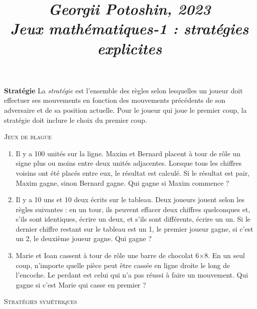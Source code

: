 \documentclass{article}
\title{
\textit{\small{Georgii Potoshin, 2023}}\\
\vspace{0.3ex}
\textit{\huge{Jeux mathématiques-1 : stratégies explicites}}\vspace{1ex}
}
\date{\vspace{-8ex}}
\begin{document}
\maketitle

\textbf{Stratégie} La \emph{stratégie} est l'ensemble des règles selon lesquelles un joueur doit effectuer ses mouvements en fonction des mouvements précédents de son adversaire et de sa position actuelle. Pour le joueur qui joue le premier coup, la stratégie doit inclure le choix du premier coup. 
\par
\vspace{3ex}
\begin{center}\textsc{\Large{Jeux de blague}}\end{center}
\begin{enumerate}
    \item Il y a 100 unités sur la ligne. Maxim et Bernard placent à tour de rôle un signe plus ou moins entre deux unités adjacentes. Lorsque tous les chiffres voisins ont été placés entre eux, le résultat est calculé. Si le résultat est pair, Maxim gagne, sinon Bernard gagne. Qui gagne si Maxim commence ?
    \item Il y a 10 uns et 10 deux écrits sur le tableau. Deux joueurs jouent selon les règles suivantes : en un tour, ils peuvent effacer deux chiffres quelconques et, s'ils sont identiques, écrire un deux, et s'ils sont différents, écrire un un. Si le dernier chiffre restant sur le tableau est un 1, le premier joueur gagne, si c'est un 2, le deuxième joueur gagne. Qui gagne ?
	\item Marie et Ioan cassent à tour de rôle une barre de chocolat 6×8. En un seul coup, n'importe quelle pièce peut être cassée en ligne droite le long de l'encoche. Le perdant est celui qui n'a pas réussi à faire un mouvement. Qui gagne si c'est Marie qui casse en premier ?
\end{enumerate}
\vspace{1ex}
\begin{center}\textsc{\Large{Stratégies symétriques}}\end{center}
\end{document}
